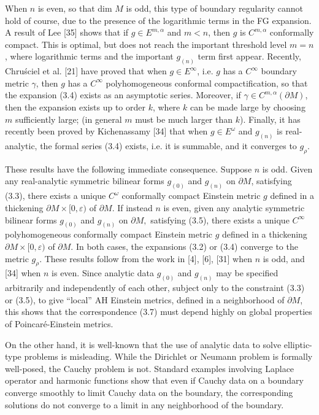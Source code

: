 \documentclass[11pt,amsfonts]{amsart}
\begin{document}
 When $n$ is even, so that dim $M$ is odd, this type of boundary 
regularity cannot hold of course, due to the presence of the 
logarithmic terms in the FG expansion. A result of Lee [35] shows that 
if $g \in  E^{m,\alpha}$ and $m < n$, then $g$ is $C^{m,\alpha}$ 
conformally compact. This is optimal, but does not reach the important 
threshold level $m = n$, where logarithmic terms and the important 
$g_{(n)}$ term first appear. Recently, Chru\'sciel et al. [21] have 
proved that when $g \in E^{\infty}$, i.e. $g$ has a $C^{\infty}$ 
boundary metric $\gamma$, then $g$ has a $C^{\infty}$ 
polyhomogeneous conformal compactification, so that the expansion (3.4) 
exists as an asymptotic series. Moreover, if $\gamma \in 
C^{m,\alpha}(\partial M)$, then the expansion exists up to order $k$, 
where $k$ can be made large by choosing $m$ sufficiently large; 
(in general $m$ must be much larger than $k$). Finally, it has recently 
been proved by Kichenassamy [34] that when $g \in E^{\omega}$ and 
$g_{(n)}$ is real-analytic, the formal series (3.4) exists, i.e. it 
is summable, and it converges to $g_{\rho}$.

\medskip

 These results have the following immediate consequence. Suppose $n$ is 
odd. Given any real-analytic symmetric bilinear forms $g_{(0)}$ and 
$g_{(n)}$ on $\partial M$, satisfying (3.3), there exists a unique 
$C^{\omega}$ conformally compact Einstein metric $g$ defined in a 
thickening $\partial M\times [0,\varepsilon)$ of $\partial M$. If 
instead $n$ is even, given any analytic symmetric bilinear forms $g_{(0)}$ 
and $g_{(n)}$ on $\partial M,$ satisfying (3.5), there exists a unique 
$C^{\infty}$ polyhomogeneous conformally compact Einstein metric $g$ 
defined in a thickening $\partial M\times [0,\varepsilon )$ of $\partial M$. 
In both cases, the expansions (3.2) or (3.4) converge to the metric 
$g_{\rho}$. These results follow from the work in [4], [6], [31] when $n$ 
is odd, and [34] when $n$ is even. Since analytic data $g_{(0)}$ and 
$g_{(n)}$ may be specified arbitrarily and independently of each other, 
subject only to the constraint (3.3) or (3.5), to give ``local'' AH 
Einstein metrics, defined in a neighborhood of $\partial M$, this shows 
that the correspondence (3.7) must depend highly on global properties 
of Poincar\'e-Einstein metrics.

 On the other hand, it is well-known that the use of analytic data to 
solve elliptic-type problems is misleading. While the Dirichlet or 
Neumann problem is formally well-posed, the Cauchy problem is not. 
Standard examples involving Laplace operator and harmonic functions 
show that even if Cauchy data on a boundary converge smoothly to limit 
Cauchy data on the boundary, the corresponding solutions do not converge 
to a limit in any neighborhood of the boundary. 
\end{document}
